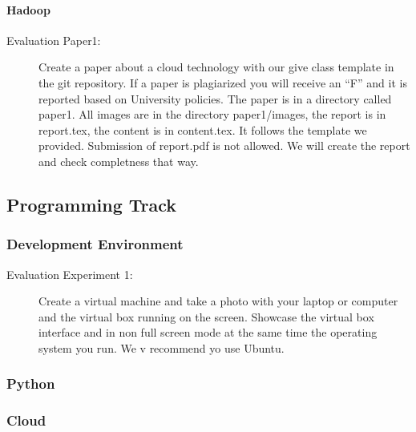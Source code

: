 \paragraph{Hadoop}


\begin{description}
\item[Evaluation Paper1:] Create a paper about a cloud technology with
  our give class template in the git repository. If a paper is
  plagiarized you will receive an ``F'' and it is reported based on
  University policies. The paper is in a directory called paper1. All
  images are in the directory paper1/images, the report is in
  report.tex, the content is in content.tex. It follows the template
  we provided. Submission of report.pdf is not allowed. We will create
  the report and check completness that way.
\end{description}

\subsection{Programming Track}

\subsubsection{Development Environment}



\begin{description}
\item[Evaluation Experiment 1:] Create a virtual machine and take a
  photo with your laptop or computer and the virtual box running on
  the screen. Showcase the virtual box interface and in non full
  screen mode at the same time the operating system you run. We
v  recommend yo use Ubuntu.
\end{description}

\subsubsection{Python}


\subsubsection{Cloud}

